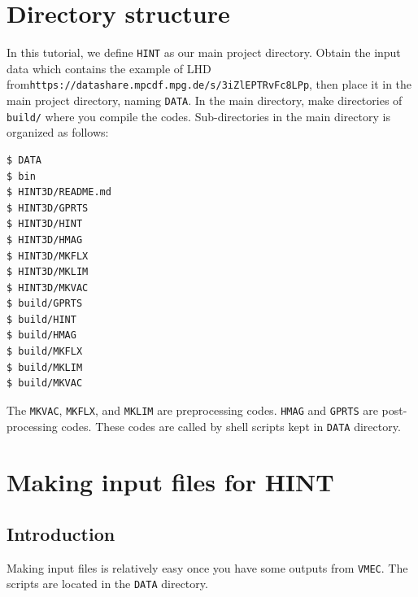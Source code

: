 \documentclass[10pt]{ltxdoc} %
\begin{document}
\section{Directory structure}

In this tutorial, we define \texttt{HINT} as our main project directory. 
Obtain the input data which contains the example of LHD from\texttt{https://datashare.mpcdf.mpg.de/s/3iZlEPTRvFc8LPp}, then place it in the main project directory, naming \texttt{DATA}.  
In the main directory, make directories of \texttt{build/} where you compile the codes. 
Sub-directories in the main directory is organized as follows:
\begin{verbatim}
$ DATA
$ bin
$ HINT3D/README.md
$ HINT3D/GPRTS
$ HINT3D/HINT
$ HINT3D/HMAG
$ HINT3D/MKFLX
$ HINT3D/MKLIM
$ HINT3D/MKVAC
$ build/GPRTS
$ build/HINT
$ build/HMAG
$ build/MKFLX
$ build/MKLIM
$ build/MKVAC

\end{verbatim}
The \texttt{MKVAC}, \texttt{MKFLX}, and \texttt{MKLIM} are preprocessing codes. \texttt{HMAG} and \texttt{GPRTS} are post-processing codes. These codes are called by shell scripts kept in \texttt{DATA} directory.

\section{Making input files for HINT}

\subsection{Introduction}
Making input files is relatively easy once you have some outputs from \texttt{VMEC}. The scripts are located in the \texttt{DATA} directory.
\end{document}
